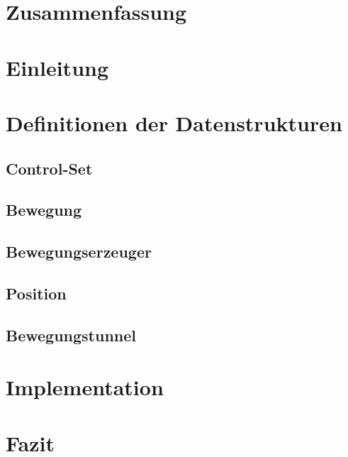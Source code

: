 \documentclass[11pt,a4paper,oneside]{article}
\begin{document}
\maketitle 
\pagebreak

\section{Zusammenfassung}


\section*{Einleitung}

\pagebreak

\tableofcontents
\pagebreak

\section{Definitionen der Datenstrukturen}

\subsection{ Control-Set}

\subsection{Bewegung}

\subsection{Bewegungserzeuger}

\subsection{Position}

\subsection{Bewegungstunnel}


\section{Implementation}


\section{ Fazit}

\end{document}
